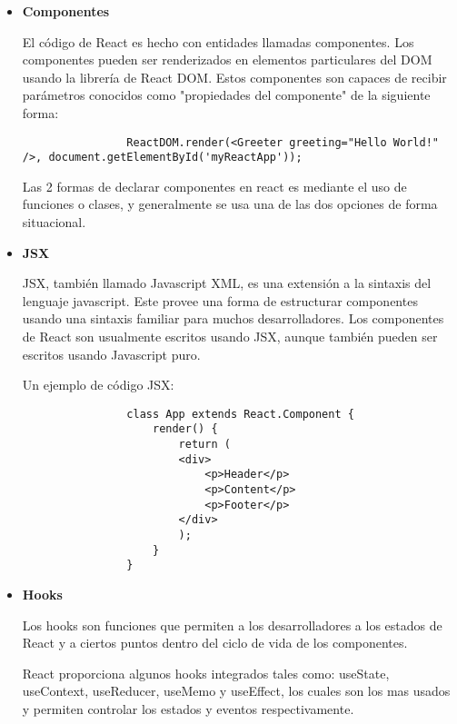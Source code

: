         \begin{itemize}

            \item \textbf{Componentes} 

            El código de React es hecho con entidades llamadas componentes. Los componentes pueden ser renderizados en elementos particulares del DOM usando la librería de React DOM. Estos componentes son capaces de recibir parámetros conocidos como "propiedades del componente" de la siguiente forma: \hfill 

            \begin{lstlisting}
                ReactDOM.render(<Greeter greeting="Hello World!" />, document.getElementById('myReactApp'));
            \end{lstlisting}

            Las 2 formas de declarar componentes en react es mediante el uso de funciones o clases, y generalmente se usa una de las dos opciones de forma situacional.

            \item \textbf{JSX}

            JSX, también llamado Javascript XML, es una extensión a la sintaxis del lenguaje javascript. Este provee una forma de estructurar componentes usando una sintaxis familiar para muchos desarrolladores. Los componentes de React son usualmente escritos usando JSX, aunque también pueden ser escritos usando Javascript puro.

            Un ejemplo de código JSX:

            \begin{lstlisting}
                class App extends React.Component {
                    render() {
                        return (
                        <div>
                            <p>Header</p>
                            <p>Content</p>
                            <p>Footer</p>
                        </div>
                        );
                    }
                }
            \end{lstlisting}

            \item \textbf{Hooks}

            Los hooks son funciones que permiten a los desarrolladores  a los estados de React y a ciertos puntos dentro del ciclo de vida de los componentes.

            React proporciona algunos hooks integrados tales como: useState, useContext, useReducer, useMemo y useEffect, los cuales son los mas usados y permiten controlar los estados y eventos respectivamente.


        \end{itemize}
        

